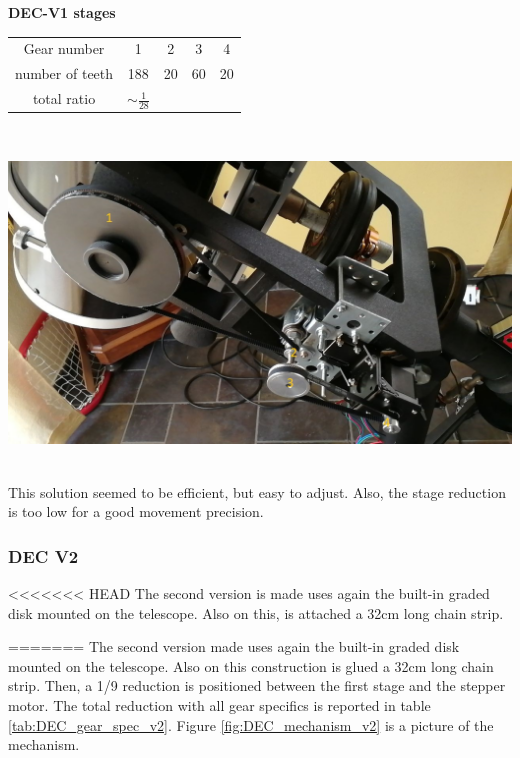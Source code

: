 \documentclass{article}
\begin{document}
\begin{multicols}{2}
        \begin{minipage}
            {0.5\textwidth}
            \centering
            \textbf{DEC-V1 stages}\\
            \begin{tabular}{ccccc}
                \hline
                Gear number & 1 & 2 & 3 & 4 \\
                number of teeth & 188 & 20 & 60 & 20 \\
                \hline
                total ratio & \(\sim \frac{1}{28}\) &&&
            \end{tabular}
            \label{tab:DEC_gear_spec}
        \end{minipage}
        \\
        \begin{minipage}
            {0.5\textwidth}
            \centering
            \includegraphics[scale=.27]{DEC_motorization.jpg}
            \label{fig:DEC_mechanism}
        \end{minipage}
        \\
        This solution seemed to be efficient, but easy to adjust.
        Also, the stage reduction is too low for a good movement precision.

        \subsubsection{DEC V2}
<<<<<<< HEAD
        The second version is made uses again the built-in graded disk mounted on the telescope.
        Also on this, is attached a 32cm long chain strip.
        
        
=======
        The second version made uses again the built-in graded disk mounted on the telescope.
        Also on this construction is glued a 32cm long chain strip.
        Then, a 1/9 reduction is positioned between the first stage and the stepper motor.
        The total reduction with all gear specifics is reported in table \ref{tab:DEC_gear_spec_v2}.
        Figure \ref{fig:DEC_mechanism_v2} is a picture of the mechanism.


\end{multicols}
\end{document}
